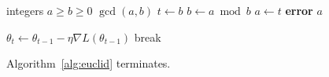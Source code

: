 \documentclass{article}
\begin{document}
\begin{algorithm}[ht]
\caption{Euclid's algorithm (algorithmic)}\label{alg:euclid}
\begin{algorithmic}[1]
\REQUIRE integers $a \ge b \ge 0$
\ENSURE $\gcd(a,b)$
  \STATE $t \gets b$
  \STATE $b \gets a \bmod b$
  \STATE $a \gets t$
\ENDWHILE
{} \STATE \textbf{error} \ELSE \RETURN $a$ \ENDIF
\end{algorithmic}
\end{algorithm}
\begin{algorithm}[ht]
\caption{Gradient descent}
\begin{algorithmic}[1]
  \STATE $\theta_t \gets \theta_{t-1} - \eta \nabla L(\theta_{t-1})$
   \STATE break \ENDIF
\ENDFOR
\end{algorithmic}
\end{algorithm}
Algorithm~\ref{alg:euclid} terminates.
\end{document}
